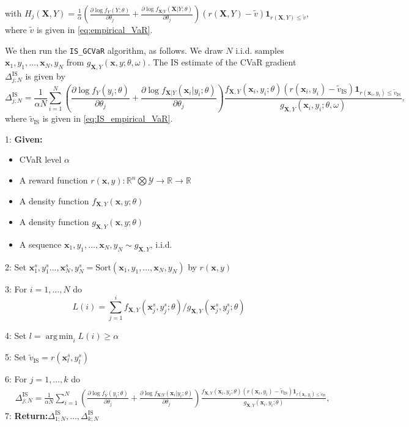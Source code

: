 \documentclass[letterpaper]{article}
\newcommand{\R}{\mathbb{R}}
\newcommand{\cY}{\mathcal{Y}}
\newcommand{\bx}{\mathbf{x}}
\newcommand{\bX}{\mathbf{X}}
\newcommand{\is}{\textrm{IS}}
\newcommand{\dcvarIS}{\Delta_{j;N}^{\is}} %
\newcommand{\evar}{\tilde{v}}  %
\newcommand{\alggiven}{\textbf{Given:}}
\newcommand{\algreturn}{\textbf{Return:}}
\DeclareMathOperator*{\argmin}{arg\,min}
\begin{document}
with $H_j(\bX,Y) = \frac{1}{\alpha} \left(\frac{\partial {\log f_Y(Y;\theta)}}{\partial \theta_j}+\frac{\partial {\log f_{\bX|Y}(\bX|Y;\theta)}}{\partial \theta_j}\right) (r(\bX,Y)-\evar) \mathbf{1}_{r(\bX,Y)\leq \evar}$, where $\evar$ is given in \eqref{eq:empirical_VaR}.

We then run the \texttt{IS\_GCVaR} algorithm, as follows. We draw $N$ i.i.d. samples $\bx_{1},y_1,\dots,\bx_{N},y_N$ from $g_{\bX,Y}\left(\bx,y;\theta,\omega\right)$. The IS estimate of the CVaR gradient $\dcvarIS$ is given by
\begin{equation}\label{eq:IS_alg}
\dcvarIS =
\frac{1}{\alpha N}\sum_{i=1}^{N} \left(\frac{\partial {\log f_Y(y_i;\theta)}}{\partial \theta_j}+\frac{\partial {\log f_{\bX|Y}(\bx_i|y_i;\theta)}}{\partial \theta_j}\right)\frac{f_{\bX,Y}(\bx_i,y_i;\theta) (r(\bx_{i},y_i)-\evar_{\is}) \mathbf{1}_{r(\bx_{i},y_i)\leq \evar_{\is}}}{g_{\bX,Y}\left(\bx_i,y_i;\theta,\omega\right)},
\end{equation}
where $\evar_{\is}$ is given in \eqref{eq:IS_empirical_VaR}.

\begin{algorithm} \label{alg:IS_GCVaR}
\caption{\texttt{IS\_GCVaR}}
1: \alggiven
\begin{itemize}
\item CVaR level $\alpha$
\item A reward function $r(\bx,y):\R^n\bigotimes \cY \to \R \to \R$
\item A density function $f_{\bX,Y}(\bx,y;\theta)$
\item A density function $g_{\bX,Y}\left(\bx,y;\theta\right)$
\item A sequence $\bx_{1},y_1,\dots,\bx_{N},y_N \sim g_{\bX,Y}$, i.i.d.
\end{itemize}
2: Set $\bx_1^s,y_1^s\dots,\bx_N^s,y_N^s = \textrm{Sort}\left(\bx_{1},y_1,\dots,\bx_{N},y_N\right)$ by $r(\bx,y)$

3: For $i = 1,\dots,N$ do
\begin{equation*}
L(i) = \sum_{j=1}^{i} f_{\bX,Y}\left(\bx^s_j,y^s_j;\theta\right) / g_{\bX,Y}\left(\bx^s_j,y^s_j;\theta\right)
\end{equation*}

4: Set $l = \argmin_i L(i) \geq \alpha $

5: Set $\evar_{\is} = r(\bx_{l}^s,y_l^s)$

6: For $j = 1,\dots,k$ do
\begin{equation*}
\begin{split}
&\dcvarIS =
\frac{1}{\alpha N}\sum_{i=1}^{N} \left(\frac{\partial {\log f_Y(y_i;\theta)}}{\partial \theta_j}+\frac{\partial {\log f_{\bX|Y}(\bx_i|y_i;\theta)}}{\partial \theta_j}\right)\frac{f_{\bX,Y}(\bx_i,y_i;\theta) (r(\bx_{i},y_i)-\evar_{\is}) \mathbf{1}_{r(\bx_{i},y_i)\leq \evar_{\is}}}{g_{\bX,Y}\left(\bx_i,y_i;\theta\right)},
\end{split}
\end{equation*}
7: \algreturn $\Delta^{\is}_{1;N},\dots,\Delta^{\is}_{k;N}$
\end{algorithm}
\end{document}
